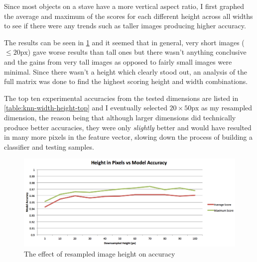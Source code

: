 Since most objects on a stave have a more vertical aspect ratio, I first graphed the average and maximum of the scores for each different height across all widths to see if there were any trends such as taller images producing higher accuracy.

The results can be seen in \cref{fig:height-resample} and it seemed that in general, very short images ($\leq 20\text{px}$) gave worse results than tall ones but there wasn't anything conclusive and the gains from very tall images as opposed to fairly small images were minimal. Since there wasn't a height which clearly stood out, an analysis of the full matrix was done to find the highest scoring height and width combinations.

The top ten experimental accuracies from the tested dimensions are listed in \cref{table:knn-width-height-top} and I eventually selected $20\times50\text{px}$ as my resampled dimension, the reason being that although larger dimensions did technically produce better accuracies, they were only \emph{slightly} better and would have resulted in many more pixels in the feature vector, slowing down the process of building a classifier and testing samples.

\begin{figure}[H]
  \includegraphics[width=\linewidth]{gfx/techniques/downsampling-height-vs-accuracy.png}
  \caption{The effect of resampled image height on accuracy}
  \label{fig:height-resample}
\end{figure}

